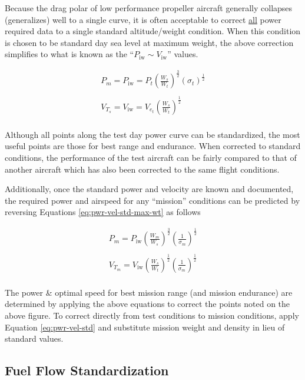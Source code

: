 \documentclass[
]{book}
\begin{document}
Because the drag polar of low performance propeller aircraft generally collapses
(generalizes) well to a single curve, it is often acceptable to correct
\underline{all} power required data to a single standard altitude/weight
condition. When this condition is chosen to be standard day sea level at maximum
weight, the above correction simplifies to what is known as the
``\(P_{\text{iw}} \sim V_{\text{iw}}\)'' values.

\[
\begin{align}
P_m = P_{\text{iw}} = P_t \left( \frac{W_s}{W_t} \right)^{\frac{3}{2}} \left( \sigma_t \right)^{\frac{1}{2}}  \\
\\
V_{T_s} = V_{\text{iw}}= V_{e_t} \left( \frac{W_s}{W_t} \right)^{\frac{1}{2}} \\
\end{align}
\label{eq:pwr-vel-std-max-wt}
\]

Although all points along the test day power curve can be standardized, the most
useful points are those for best range and endurance. When corrected to standard
conditions, the performance of the test aircraft can be fairly compared to that
of another aircraft which has also been corrected to the same flight conditions.

Additionally, once the standard power and velocity are known and documented, the
required power and airspeed for any ``mission'' conditions can be predicted by
reversing Equations \eqref{eq:pwr-vel-std-max-wt} as follows

\[
\begin{align}
P_m = P_{\text{iw}} \left( \frac{W_m}{W_s} \right)^{\frac{3}{2}} \left( \frac{1}{\sigma_m} \right)^{\frac{1}{2}} \\
\\
V_{T_m} = V_{\text{iw}} \left( \frac{W_s}{W_t} \right)^{\frac{1}{2}} \left( \frac{1}{\sigma_m} \right)^{\frac{1}{2}}\\
\end{align}
\label{eq:pwr-vel-msn}
\]

The power \& optimal speed for best mission range (and mission endurance) are
determined by applying the above equations to correct the points noted on the
above figure. To correct directly from test conditions to mission conditions,
apply Equation \eqref{eq:pwr-vel-std} and substitute mission weight and density
in lieu of standard values.

\hypertarget{fuel-flow-standardization}{%
\subsection{Fuel Flow Standardization}\label{fuel-flow-standardization}}
\end{document}
